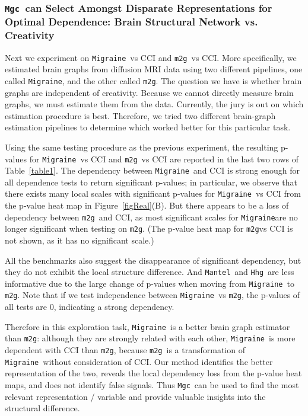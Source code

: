 \documentclass[11pt]{article}
\providecommand{\sct}[1]{{\sc \texttt{#1}}}
\newcommand{\Migraine}{\sct{Migraine}}
\newcommand{\mtg}{\sct{m2g}}
\newcommand{\Mgc}{\sct{Mgc}}
\newcommand{\Hhg}{\sct{Hhg}}
\newcommand{\Mantel}{\sct{Mantel}}
\begin{document}
\subsubsection[Optimal Representations]{\Mgc~can Select Amongst Disparate Representations for Optimal Dependence: Brain Structural Network vs. Creativity}

Next we experiment on \Migraine~vs CCI and \mtg~vs CCI. More specifically, we estimated brain graphs from diffusion MRI data using two different pipelines, one called \Migraine, and the other called \mtg.  The question we have is whether brain graphs are independent of creativity.  Because we cannot directly measure brain graphs, we must estimate them from the data.  Currently, the jury is out on which estimation procedure is best.  Therefore, we tried two different brain-graph estimation pipelines to determine which worked better for this particular task.

Using the same testing procedure as the previous experiment, the resulting p-values for \Migraine~vs CCI and \mtg~vs CCI are reported in the last two rows of Table~\ref{table1}. The dependency between \Migraine~and CCI is strong enough for all dependence tests to return significant p-values; in particular, we observe that there exists many local scales with significant p-values for \Migraine~vs CCI from the p-value heat map in Figure~\ref{figReal}(B). But there appears to be a loss of dependency between \mtg~and CCI, as most significant scales for \Migraine are no longer significant when testing on \mtg. (The p-value heat map for \mtg vs CCI is not shown, as it has no significant scale.)

All the benchmarks also suggest the disappearance of significant dependency, but they do not exhibit the local structure difference. And \Mantel~and \Hhg~are less informative due to the large change of p-values when moving from \Migraine~to \mtg. Note that if we test independence between \Migraine~vs \mtg, the p-values of all tests are $0$, indicating a strong dependency. 

Therefore in this exploration task, \Migraine~is a better brain graph estimator than \mtg: although they are strongly related with each other, \Migraine~is more dependent with CCI than \mtg, because \mtg~is a transformation of \Migraine~without consideration of CCI. Our method identifies the better representation of the two, reveals the local dependency loss from the p-value heat maps, and does not identify false signals. Thus \Mgc~can be used to find the most relevant representation / variable and provide valuable insights into the structural difference.
\end{document}
